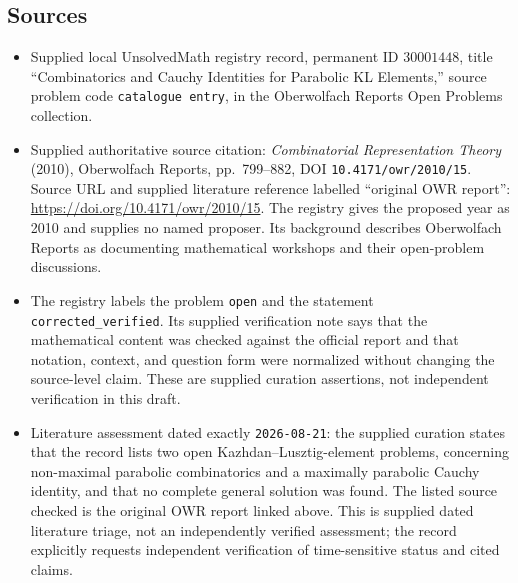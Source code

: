 \documentclass[11pt]{article}
\begin{document}
\subsection{Sources}
\begin{itemize}
\item Supplied local UnsolvedMath registry record, permanent ID \(30001448\), title ``Combinatorics and Cauchy Identities for Parabolic KL Elements,'' source problem code \texttt{catalogue entry}, in the Oberwolfach Reports Open Problems collection.
\item Supplied authoritative source citation: \emph{Combinatorial Representation Theory} (2010), Oberwolfach Reports, pp.\ 799--882, DOI \texttt{10.4171/owr/2010/15}. Source URL and supplied literature reference labelled ``original OWR report'': \url{https://doi.org/10.4171/owr/2010/15}. The registry gives the proposed year as 2010 and supplies no named proposer. Its background describes Oberwolfach Reports as documenting mathematical workshops and their open-problem discussions.
\item The registry labels the problem \texttt{open} and the statement \texttt{corrected\_verified}. Its supplied verification note says that the mathematical content was checked against the official report and that notation, context, and question form were normalized without changing the source-level claim. These are supplied curation assertions, not independent verification in this draft.
\item Literature assessment dated exactly \texttt{2026-08-21}: the supplied curation states that the record lists two open Kazhdan--Lusztig-element problems, concerning non-maximal parabolic combinatorics and a maximally parabolic Cauchy identity, and that no complete general solution was found. The listed source checked is the original OWR report linked above. This is supplied dated literature triage, not an independently verified assessment; the record explicitly requests independent verification of time-sensitive status and cited claims.
\end{itemize}
\end{document}
